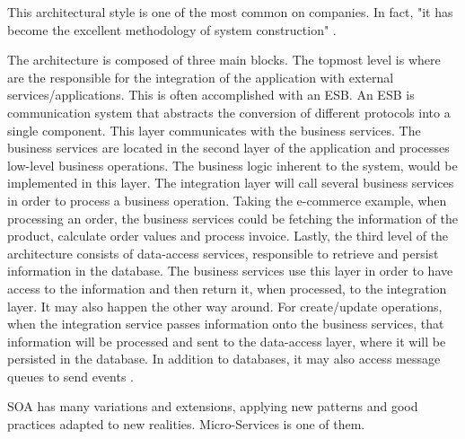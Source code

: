 \par
This architectural style is one of the most common on companies. In fact, "it has become the excellent methodology of system construction" \parencite{soaPetroleum}.
\par
The architecture is composed of three main blocks. The topmost level is where are the responsible for the integration of the application with external services/applications. This is often accomplished with an \gls{ESB}. An \gls{ESB} is communication system that abstracts the conversion of different protocols into a single component. This layer communicates with the business services. The business services are located in the second layer of the application and processes low-level business operations. The business logic inherent to the system, would be implemented in this layer. The integration layer will call several business services in order to process a business operation. Taking the e-commerce example, when processing an order, the business services could be fetching the information of the product, calculate order values and process invoice. Lastly, the third level of the architecture consists of data-access services, responsible to retrieve and persist information in the database. The business services use this layer in order to have access to the information and then return it, when processed, to the integration layer. It may also happen the other way around. For create/update operations, when the integration service passes information onto the business services, that information will be processed and sent to the data-access layer, where it will be persisted in the database. In addition to databases, it may also access message queues to send events \parencite{soaIBM}.


\par
\gls{SOA} has many variations and extensions, applying new patterns and good practices adapted to new realities. Micro-Services is one of them.

